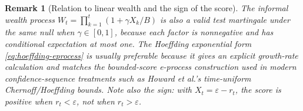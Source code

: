 \documentclass[11pt]{article}
\newtheorem{remark}[theorem]{Remark}
\begin{document}
\begin{remark}[Relation to linear wealth and the sign of the score]\label{rem:linear-wealth}
The informal wealth process $W_t=\prod_{k=1}^{t}(1+\gamma X_k/B)$ is also a valid test martingale under the same null when $\gamma\in[0,1]$, because each factor is nonnegative and has conditional expectation at most one.  The Hoeffding exponential form \eqref{eq:hoeffding-eprocess} is usually preferable because it gives an explicit growth-rate calculation and matches the bounded-score e-process construction used in modern confidence-sequence treatments such as Howard et al.'s time-uniform Chernoff/Hoeffding bounds.  Note also the sign: with $X_t=\varepsilon-r_t$, the score is positive when $r_t<\varepsilon$, not when $r_t>\varepsilon$.
\end{remark}
\end{document}
